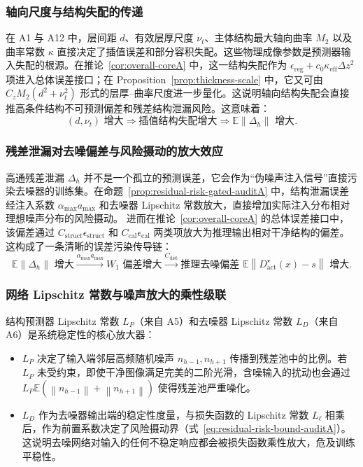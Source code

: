 \documentclass[11pt,a4paper,UTF8,fontset=fandol]{ctexart}
\theoremstyle{definition}
\newcommand{\norm}[1]{\left\lVert#1\right\rVert}
\newcommand{\E}{\mathbb{E}}
\begin{document}
\subsubsection{轴向尺度与结构失配的传递}
在 A1 与 A12 中，层间距 $d$、有效层厚尺度 $\nu_t$、主体结构最大轴向曲率 $M_2$ 以及曲率常数 $\kappa$ 直接决定了插值误差和部分容积失配。这些物理成像参数是预测器输入失配的根源。在推论~\ref{cor:overall-coreA} 中，这一结构失配作为 $\epsilon_{\mathrm{reg}}+c_0\kappa_{\mathrm{eff}}\Delta z^2$ 项进入总体误差接口；在 Proposition~\ref{prop:thickness-scale} 中，它又可由 $C_z M_2(d^2 + \nu_t^2)$ 形式的层厚--曲率尺度进一步量化。这说明轴向结构失配会直接推高条件结构不可预测偏差和残差结构泄漏风险。这意味着：
\begin{equation}
    (d, \nu_t) \text{ 增大} \Longrightarrow \text{插值结构失配增大} \Longrightarrow \E\norm{\Delta_h} \text{ 增大}.
\end{equation}

\subsubsection{残差泄漏对去噪偏差与风险摄动的放大效应}
高通残差泄漏 $\Delta_h$ 并不是一个孤立的预测误差，它会作为“伪噪声注入信号”直接污染去噪器的训练集。在命题~\ref{prop:residual-risk-gated-auditA} 中，结构泄漏误差经注入系数 $\alpha_{\max} a_{\max}$ 和去噪器 Lipschitz 常数放大，直接增加实际注入分布相对理想噪声分布的风险摄动。
进而在推论~\ref{cor:overall-coreA} 的总体误差接口中，该偏差通过 $C_{\mathrm{struct}}\epsilon_{\mathrm{struct}}$ 和 $C_{\mathrm{cal}}\epsilon_{\mathrm{cal}}$ 两类项放大为推理输出相对干净结构的偏差。这构成了一条清晰的误差污染传导链：
\begin{equation}
    \E\norm{\Delta_h} \text{ 增大} \stackrel{\alpha_{\max}a_{\max}}{\longrightarrow} W_1\text{ 偏差增大} \stackrel{C_{\mathrm{dist}}}{\longrightarrow} \text{推理去噪偏差 } \E\norm{D^\star_{\mathrm{act}}(x)-s} \text{ 增大}.
\end{equation}

\subsubsection{网络 Lipschitz 常数与噪声放大的乘性级联}
结构预测器 Lipschitz 常数 $L_P$（来自 A5）和去噪器 Lipschitz 常数 $L_D$（来自 A6）是系统稳定性的核心放大器：
\begin{itemize}[leftmargin=2em]
    \item $L_P$ 决定了输入端邻层高频随机噪声 $n_{h-1}, n_{h+1}$ 传播到残差池中的比例。若 $L_P$ 未受约束，即使干净图像满足完美的二阶光滑，含噪输入的扰动也会通过 $L_P\E(\norm{n_{h-1}}+\norm{n_{h+1}})$ 使得残差池严重噪化。
    \item $L_D$ 作为去噪器输出端的稳定性度量，与损失函数的 Lipschitz 常数 $L_\ell$ 相乘后，作为前置系数决定了风险摄动界（式~\eqref{eq:residual-risk-bound-auditA}）。这说明去噪网络对输入的任何不稳定响应都会被损失函数乘性放大，危及训练平稳性。
\end{itemize}
\end{document}
